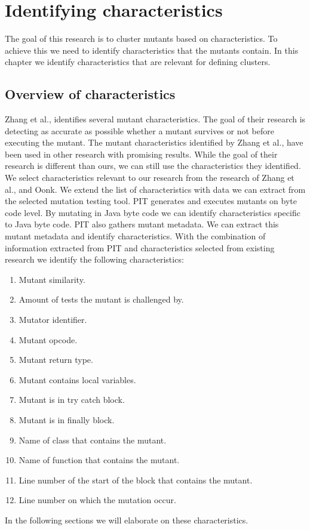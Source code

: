 \documentclass[../../main]{subfiles}
\begin{document}
\section{Identifying characteristics}
\label{ch:clustering_characteristics}
The goal of this research is to cluster mutants based on characteristics. 
To achieve this we need to identify characteristics that the mutants contain. 
In this chapter we identify characteristics that are relevant for defining clusters. 

\subsection{Overview of characteristics}
Zhang et al., identifies several mutant characteristics\cite{Zhang2019PredictiveTesting}. 
The goal of their research is detecting as accurate as possible whether a mutant survives or not before executing the mutant.
The mutant characteristics identified by Zhang et al., have been used in other research with promising results\cite{Oonk2021}.
While the goal of their research is different than ours, we can still use the characteristics they identified.
We select characteristics relevant to our research from the research of Zhang et al., and Oonk\cite{Oonk2021}.
We extend the list of characteristics with data we can extract from the selected mutation testing tool. 
\newline
PIT generates and executes mutants on byte code level\cite{pitestBytecode}.
By mutating in Java byte code we can identify characteristics specific to Java byte code.
PIT also gathers mutant metadata.
We can extract this mutant metadata and identify characteristics. 
With the combination of information extracted from PIT and characteristics selected from existing research we identify the following characteristics:
\begin{enumerate}
    \item Mutant similarity.
    \item Amount of tests the mutant is challenged by.
    \item Mutator identifier.
    \item Mutant opcode.
    \item Mutant return type.
    \item Mutant contains local variables.
    \item Mutant is in try catch block.
    \item Mutant is in finally block.
    \item Name of class that contains the mutant.
    \item Name of function that contains the mutant.
    \item Line number of the start of the block that contains the mutant.
    \item Line number on which the mutation occur.
\end{enumerate}
In the following sections we will elaborate on these characteristics.
\end{document}
